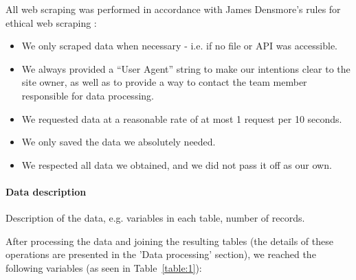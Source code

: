 \documentclass[11pt,a4paper]{article}
\begin{document}
\bigskip 

All web scraping was performed in accordance with James Densmore's rules for ethical web scraping \cite{EiWS}:
\begin{itemize}
    \item We only scraped data when necessary - i.e. if no file or API was accessible.
    \item We always provided a “User Agent” string to make our intentions clear to the site owner, as well as to provide a way to contact the team member responsible for data processing.
    \item We requested data at a reasonable rate of at most 1 request per 10 seconds.
    \item We only saved the data we absolutely needed.
    \item We respected all data we obtained, and we did not pass it off as our own.
\end{itemize}

\paragraph{Data description} Description of the data, e.g. variables
in each table, number of records.
    
\medskip
After processing the data and joining the resulting tables (the details of these operations are presented in the 'Data processing' section), we reached the following variables (as seen in Table~\ref{table:1}):
\end{document}
